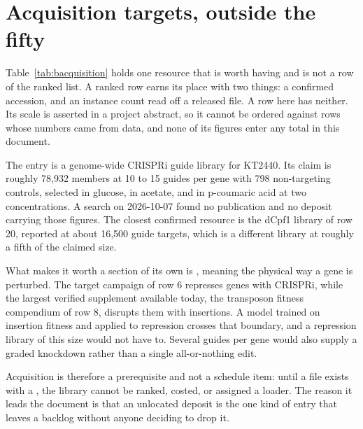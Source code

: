 
\section{Acquisition targets, outside the fifty}\label{sec:acquisition}

Table~\ref{tab:bacquisition} holds one resource that is worth having and is not a row of
the ranked list. A ranked row earns its place with two things: a confirmed accession, and
an instance count read off a released file. A row here has neither. Its scale is asserted
in a project abstract, so it cannot be ordered against rows whose numbers came from data,
and none of its figures enter any total in this document.

The entry is a genome-wide CRISPRi guide library for  KT2440. Its claim is
roughly 78,932 members at 10 to 15 guides per gene with 798 non-targeting controls,
selected in glucose, in acetate, and in p-coumaric acid at two concentrations. A search on
2026-10-07 found no publication and no deposit carrying those figures. The closest
confirmed resource is the dCpf1 library of row 20, reported at about 16,500 guide targets,
which is a different library at roughly a fifth of the claimed size.

What makes it worth a section of its own is , meaning the physical way a
gene is perturbed. The target campaign of row 6 represses genes with CRISPRi, while the
largest verified supplement available today, the transposon fitness compendium of row 8,
disrupts them with insertions. A model trained on insertion fitness and applied to
repression crosses that boundary, and a repression library of this size would not have to.
Several guides per gene would also supply a graded knockdown rather than a single
all-or-nothing edit.

Acquisition is therefore a prerequisite and not a schedule item: until a file exists with a
, the library cannot be ranked, costed, or assigned a loader. The reason it
leads the document is that an unlocated deposit is the one kind of entry that leaves a
backlog without anyone deciding to drop it.


